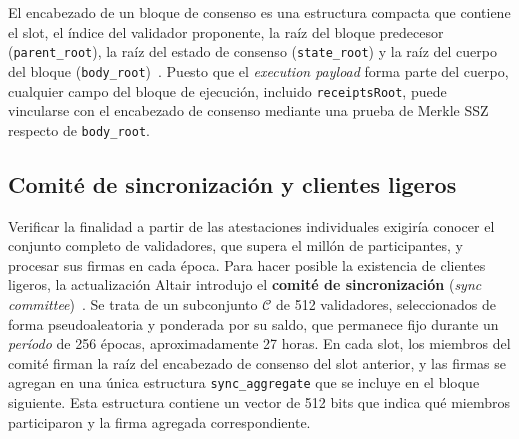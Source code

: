 El encabezado de un bloque de consenso es una estructura compacta que contiene el slot, el
índice del validador proponente, la raíz del bloque predecesor (\texttt{parent\_root}), la raíz
del estado de consenso (\texttt{state\_root}) y la raíz del cuerpo del bloque
(\texttt{body\_root})~\cite{ethconsensusphase0}. Puesto que el \textit{execution payload} forma
parte del cuerpo, cualquier campo del bloque de ejecución, incluido \texttt{receiptsRoot}, puede
vincularse con el encabezado de consenso mediante una prueba de Merkle SSZ respecto de
\texttt{body\_root}.

\subsection{Comité de sincronización y clientes ligeros}
\label{sec:eth_sync_committee}

Verificar la finalidad a partir de las atestaciones individuales exigiría conocer el conjunto
completo de validadores, que supera el millón de participantes, y procesar sus firmas en cada
época. Para hacer posible la existencia de clientes ligeros, la actualización Altair introdujo el
\textbf{comité de sincronización} (\textit{sync committee})~\cite{ethconsensusaltair}. Se trata
de un subconjunto $\mathcal{C}$ de 512 validadores, seleccionados de forma pseudoaleatoria y
ponderada por su saldo, que permanece fijo durante un \textit{período} de 256 épocas,
aproximadamente 27 horas. En cada slot, los miembros del comité firman la raíz del encabezado de
consenso del slot anterior, y las firmas se agregan en una única estructura
\texttt{sync\_aggregate} que se incluye en el bloque siguiente. Esta estructura contiene un
vector de 512 bits que indica qué miembros participaron y la firma agregada correspondiente.

